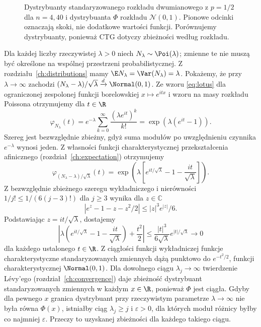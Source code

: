 \begin{figure}[htbp]
\caption{Dystrybuanty standaryzowanego rozkładu dwumianowego
z $p=1/2$ dla $n=4,40$ i dystrybuanta $\Phi$ rozkładu
$\mathcal N(0,1)$. Pionowe odcinki oznaczają skoki,
nie dodatkowe wartości funkcji. Porównujemy dystrybuanty,
ponieważ CTG dotyczy zbieżności według rozkładu.}
\label{fig:rp1-09-clt-cdf}
\end{figure}


\begin{przyklad}
Dla każdej liczby rzeczywistej $\lambda>0$ niech
$N_\lambda\sim\Poi(\lambda)$; zmienne te nie muszą
być określone na wspólnej przestrzeni probabilistycznej.
Z rozdziału~\ref{ch:distributions} mamy
$\E N_\lambda=\Var(N_\lambda)=\lambda$.
Pokażemy, że przy $\lambda\to\infty$ zachodzi
$(N_\lambda-\lambda)/\sqrt\lambda\xrightarrow d\Normal(0,1)$.
Ze wzoru \eqref{eq:lotus} dla ograniczonej zespolonej
funkcji borelowskiej $x\mapsto e^{itx}$ i wzoru
na masy rozkładu Poissona otrzymujemy dla $t\in\R$
\[
\varphi_{N_\lambda}(t)=
e^{-\lambda}\sum_{k=0}^\infty\frac{(\lambda e^{it})^k}{k!}
=\exp(\lambda(e^{it}-1)).
\]
Szereg jest bezwzględnie zbieżny, gdyż suma modułów
po uwzględnieniu czynnika $e^{-\lambda}$ wynosi jeden.
Z własności funkcji charakterystycznej przekształcenia
afinicznego (rozdział~\ref{ch:expectation}) otrzymujemy
\[
\varphi_{(N_\lambda-\lambda)/\sqrt\lambda}(t)
=\exp\!\left(\lambda\left[e^{it/\sqrt\lambda}
-1-\frac{it}{\sqrt\lambda}\right]\right).
\]
Z bezwzględnie zbieżnego szeregu wykładniczego
i nierówności $1/j!\leq 1/(6(j-3)!)$ dla $j\geq3$
wynika dla $z\in\mathbb C$
\[
|e^z-1-z-z^2/2|\leq |z|^3 e^{|z|}/6.
\]
Podstawiając $z=it/\sqrt\lambda$, dostajemy
\[
\left|\lambda\left(e^{it/\sqrt\lambda}-1-
\frac{it}{\sqrt\lambda}\right)+\frac{t^2}{2}\right|
\leq\frac{|t|^3}{6\sqrt\lambda}e^{|t|/\sqrt\lambda}
\longrightarrow0
\]
dla każdego ustalonego $t\in\R$.
Z ciągłości funkcji wykładniczej funkcje charakterystyczne
standaryzowanych zmiennych dążą punktowo do
$e^{-t^2/2}$, funkcji charakterystycznej $\Normal(0,1)$.
Dla dowolnego ciągu $\lambda_j\to\infty$ twierdzenie
Lévy'ego (rozdział~\ref{ch:convergence}) daje zbieżność
dystrybuant standaryzowanych zmiennych w każdym
$x\in\R$, ponieważ $\Phi$ jest ciągła.
Gdyby dla pewnego $x$ granica dystrybuant przy
rzeczywistym parametrze $\lambda\to\infty$ nie była
równa $\Phi(x)$, istniałby ciąg $\lambda_j\geq j$
i $\varepsilon>0$, dla których moduł różnicy byłby
co najmniej $\varepsilon$. Przeczy to uzyskanej
zbieżności dla każdego takiego ciągu.
\end{przyklad}

